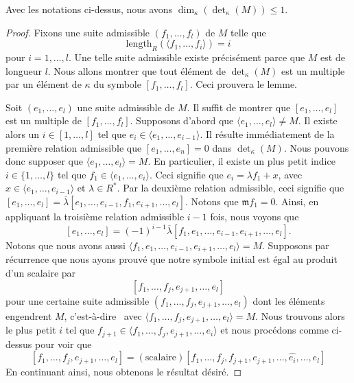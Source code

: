 \begin{lemma}
\label{lemma-dimension-at-most-one}
Avec les notations ci-dessus, nous avons $\dim_\kappa(\det_\kappa(M)) \leq 1$.
\end{lemma}

\begin{proof}
Fixons une suite admissible $(f_1, \ldots, f_l)$ de $M$ telle que
$$
\text{length}_R(\langle f_1, \ldots, f_i\rangle) = i
$$
pour $i = 1, \ldots, l$. Une telle suite admissible existe précisément parce que
$M$ est de longueur $l$. Nous allons montrer que tout élément de
$\det_\kappa(M)$ est un multiple par un élément de $\kappa$ du symbole
$[f_1, \ldots, f_l]$. Ceci prouvera le lemme.

\medskip\noindent
Soit $(e_1, \ldots, e_l)$ une suite admissible de $M$.
Il suffit de montrer que $[e_1, \ldots, e_l]$ est un multiple
de $[f_1, \ldots, f_l]$. Supposons d'abord que
$\langle e_1, \ldots, e_l\rangle \not = M$. Il existe alors
un $i \in [1, \ldots, l]$ tel que
$e_i \in \langle e_1, \ldots, e_{i - 1}\rangle$. Il résulte immédiatement
de la première relation admissible que
$[e_1, \ldots, e_n] = 0$ dans $\det_\kappa(M)$.
Nous pouvons donc supposer que $\langle e_1, \ldots, e_l\rangle = M$.
En particulier, il existe un plus petit indice $i \in \{1, \ldots, l\}$
tel que $f_1 \in \langle e_1, \ldots, e_i\rangle$. Ceci signifie
que $e_i = \lambda f_1 + x$, avec
$x \in \langle e_1, \ldots, e_{i - 1}\rangle$ et $\lambda \in R^*$.
Par la deuxième relation admissible, ceci signifie que
$[e_1, \ldots, e_l] =
\overline{\lambda}[e_1, \ldots, e_{i - 1}, f_1, e_{i + 1}, \ldots, e_l]$.
Notons que $\mathfrak m f_1 = 0$. Ainsi, en appliquant la troisième
relation admissible $i - 1$ fois, nous voyons que
$$
[e_1, \ldots, e_l] =
(-1)^{i - 1}\overline{\lambda}
[f_1, e_1, \ldots, e_{i - 1}, e_{i + 1}, \ldots, e_l].
$$
Notons que nous avons aussi
$ \langle f_1, e_1, \ldots, e_{i - 1}, e_{i + 1}, \ldots, e_l\rangle = M$.
Supposons par récurrence que nous ayons prouvé que notre symbole
initial est égal au produit d'un scalaire par
$$
[f_1, \ldots, f_j, e_{j + 1}, \ldots, e_l]
$$
pour une certaine suite admissible $(f_1, \ldots, f_j, e_{j + 1}, \ldots, e_l)$
dont les éléments engendrent $M$, c'est-à-dire \ avec
$\langle f_1, \ldots, f_j, e_{j + 1}, \ldots, e_l\rangle = M$.
Nous trouvons alors le plus petit $i$ tel que
$f_{j + 1} \in \langle f_1, \ldots, f_j, e_{j + 1}, \ldots, e_i\rangle$
et nous procédons comme ci-dessus pour voir que
$$
[f_1, \ldots, f_j, e_{j + 1}, \ldots, e_l]
=
(\text{scalaire}) [f_1, \ldots, f_j, f_{j + 1}, e_{j + 1},
\ldots, \hat{e_i}, \ldots, e_l]
$$
En continuant ainsi, nous obtenons le résultat désiré.
\end{proof}

